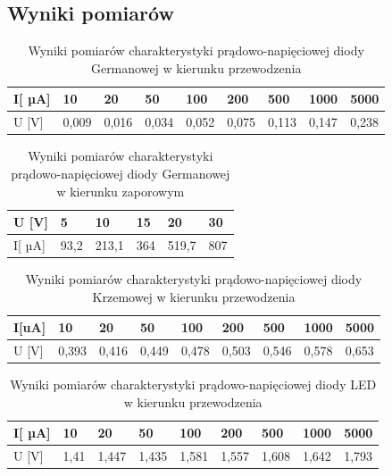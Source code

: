 \documentclass[10pt]{article}
\begin{document}
\subsection*{Wyniki pomiarów}
\begin{table}[!ht]
    \centering
    \caption{Wyniki pomiarów charakterystyki prądowo-napięciowej diody Germanowej w kierunku przewodzenia}
    \begin{tabular}{|l|l|l|l|l|l|l|l|l|}
    \hline
        I[ µA] & 10 & 20 & 50 & 100 & 200 & 500 & 1000 & 5000 \\ \hline
        U [V] & 0,009 & 0,016 & 0,034 & 0,052 & 0,075 & 0,113 & 0,147 & 0,238 \\ \hline
    \end{tabular}
\end{table}
\begin{table}[!ht]
    \centering
    \caption{Wyniki pomiarów charakterystyki prądowo-napięciowej diody Germanowej w kierunku zaporowym}
    \begin{tabular}{|l|l|l|l|l|l|}
    \hline
        U [V] & 5 & 10 & 15 & 20 & 30 \\ \hline
        I[ µA] & 93,2 & 213,1 & 364 & 519,7 & 807 \\ \hline
    \end{tabular}
\end{table}
\begin{table}[!ht]
    \centering
    \caption{Wyniki pomiarów charakterystyki prądowo-napięciowej diody Krzemowej w kierunku przewodzenia}
    \begin{tabular}{|l|l|l|l|l|l|l|l|l|}
    \hline
        I[uA] & 10 & 20 & 50 & 100 & 200 & 500 & 1000 & 5000 \\ \hline
        U [V] & 0,393 & 0,416 & 0,449 & 0,478 & 0,503 & 0,546 & 0,578 & 0,653 \\ \hline
    \end{tabular}
\end{table}
\begin{table}[!ht]
    \centering
    \caption{Wyniki pomiarów charakterystyki prądowo-napięciowej diody LED w kierunku przewodzenia}
    \begin{tabular}{|l|l|l|l|l|l|l|l|l|}
    \hline
        I[ µA] & 10 & 20 & 50 & 100 & 200 & 500 & 1000 & 5000 \\ \hline
        U [V] & 1,41 & 1,447 & 1,435 & 1,581 & 1,557 & 1,608 & 1,642 & 1,793 \\ \hline
    \end{tabular}
\end{table}
\end{document}
